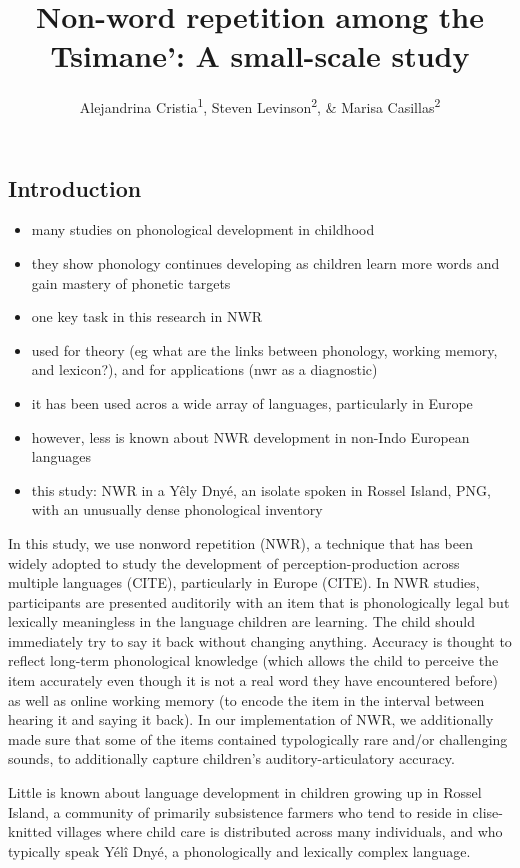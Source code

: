 \documentclass[english,,man,floatsintext]{apa6}
\title{Non-word repetition among the Tsimane': A small-scale study}
\author{Alejandrina Cristia\textsuperscript{1}, Steven Levinson\textsuperscript{2}, \& Marisa Casillas\textsuperscript{2}}
\date{}
\affiliation{
\vspace{0.5cm}
\textsuperscript{1} LSCP, Département d’études cognitives, ENS, EHESS, CNRS, Université PSL\\\textsuperscript{2} MPI}
\providecommand{\tightlist}{%
  \setlength{\itemsep}{0pt}\setlength{\parskip}{0pt}}
\begin{document}
\maketitle

\hypertarget{introduction}{%
\subsection{Introduction}\label{introduction}}

\begin{itemize}
\tightlist
\item
  many studies on phonological development in childhood
\item
  they show phonology continues developing as children learn more words and gain mastery of phonetic targets
\item
  one key task in this research in NWR
\item
  used for theory (eg what are the links between phonology, working memory, and lexicon?), and for applications (nwr as a diagnostic)
\item
  it has been used acros a wide array of languages, particularly in Europe
\item
  however, less is known about NWR development in non-Indo European languages
\item
  this study: NWR in a Yêly Dnyé, an isolate spoken in Rossel Island, PNG, with an unusually dense phonological inventory
\end{itemize}

In this study, we use nonword repetition (NWR), a technique that has been widely adopted to study the development of perception-production across multiple languages (CITE), particularly in Europe (CITE). In NWR studies, participants are presented auditorily with an item that is phonologically legal but lexically meaningless in the language children are learning. The child should immediately try to say it back without changing anything. Accuracy is thought to reflect long-term phonological knowledge (which allows the child to perceive the item accurately even though it is not a real word they have encountered before) as well as online working memory (to encode the item in the interval between hearing it and saying it back). In our implementation of NWR, we additionally made sure that some of the items contained typologically rare and/or challenging sounds, to additionally capture children's auditory-articulatory accuracy.

Little is known about language development in children growing up in Rossel Island, a community of primarily subsistence farmers who tend to reside in clise-knitted villages where child care is distributed across many individuals, and who typically speak Yélî Dnyé, a phonologically and lexically complex language.
\end{document}
